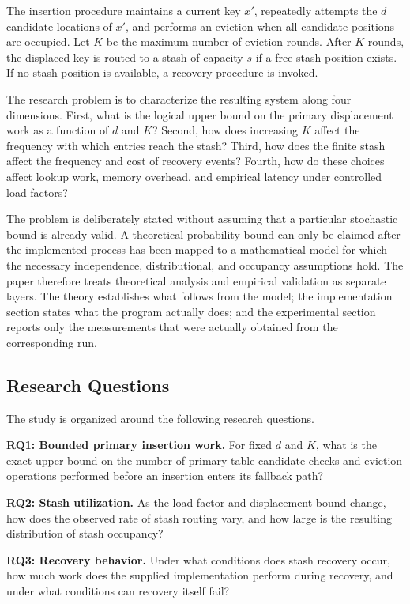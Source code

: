 \documentclass[conference]{IEEEtran}
\begin{document}
The insertion procedure maintains a current key $x'$, repeatedly attempts the $d$ candidate locations of $x'$, and performs an eviction when all candidate positions are occupied. Let $K$ be the maximum number of eviction rounds. After $K$ rounds, the displaced key is routed to a stash of capacity $s$ if a free stash position exists. If no stash position is available, a recovery procedure is invoked.

The research problem is to characterize the resulting system along four dimensions. First, what is the logical upper bound on the primary displacement work as a function of $d$ and $K$? Second, how does increasing $K$ affect the frequency with which entries reach the stash? Third, how does the finite stash affect the frequency and cost of recovery events? Fourth, how do these choices affect lookup work, memory overhead, and empirical latency under controlled load factors?

The problem is deliberately stated without assuming that a particular stochastic bound is already valid. A theoretical probability bound can only be claimed after the implemented process has been mapped to a mathematical model for which the necessary independence, distributional, and occupancy assumptions hold. The paper therefore treats theoretical analysis and empirical validation as separate layers. The theory establishes what follows from the model; the implementation section states what the program actually does; and the experimental section reports only the measurements that were actually obtained from the corresponding run.

\subsection{Research Questions}

The study is organized around the following research questions.

\textbf{RQ1: Bounded primary insertion work.} For fixed $d$ and $K$, what is the exact upper bound on the number of primary-table candidate checks and eviction operations performed before an insertion enters its fallback path?

\textbf{RQ2: Stash utilization.} As the load factor and displacement bound change, how does the observed rate of stash routing vary, and how large is the resulting distribution of stash occupancy?

\textbf{RQ3: Recovery behavior.} Under what conditions does stash recovery occur, how much work does the supplied implementation perform during recovery, and under what conditions can recovery itself fail?
\end{document}
